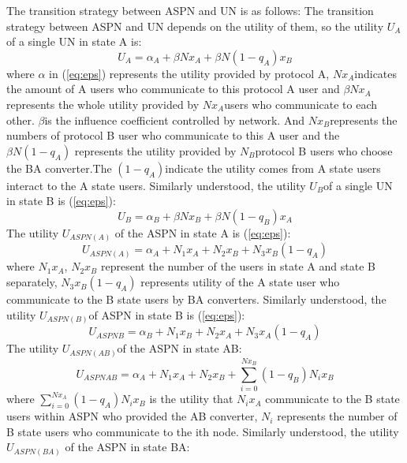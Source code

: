 \documentclass{article}
\begin{document}
The transition strategy between ASPN and UN is as follows:
The transition strategy between ASPN and UN depends on the utility of them, so the utility \(U_{A}\) of a single UN
in state A is:
\begin{displaymath} \label{eq:eps}
U_{A}=\alpha_{A}+\beta Nx_{A}+\beta N(1-q_{A})x_{B}
\end{displaymath}
where \(\alpha\) in (\ref{eq:eps}) represents the utility provided by protocol A, \(Nx_{A}\)indicates the amount of
A users who communicate to this protocol A user and \(\beta Nx_{A}\) represents the whole utility provided
by \(Nx_{A}\)users who communicate to each other. \(\beta\)is the influence coefficient controlled by network.
And \(Nx_{B}\)represents the numbers of protocol B user who communicate to this A user and the \(\beta N(1-q_{A})\)
represents the utility provided by \(N_{B}\)protocol B users who choose the BA converter.The \((1-q_{A})\)indicate the
utility comes from A state users interact to the A state users. Similarly understood, the utility \(U_{B}\)of a single UN in
state B is (\ref{eq:eps}):
\begin{displaymath}\label{eq:eps}
U_{B}=\alpha_{B}+\beta Nx_{B}+\beta N(1-q_{B})x_{A}
\end{displaymath}
The utility \(U_{ASPN(A)}\) of the ASPN in state A is (\ref{eq:eps}):
\begin{displaymath}\label{eq:eps}
U_{ASPN(A)}=\alpha_{A}+N_{1}x_{A}+N_{2}x_{B}+N_{3}x_{B}(1-q_{A})
\end{displaymath}
where \(N_{1}x_{A}\), \(N_{2}x_{B}\) represent the number of the users in state A and state B separately,
\(N_{3}x_{B}(1-q_{A})\) represents utility of the A state user who communicate to the B state users by
BA converters. Similarly understood, the utility \(U_{ASPN(B)}\)of ASPN in state B is (\ref{eq:eps}):
\begin{displaymath} \label{eq:eps}
U_{ASPN{B}}=\alpha_{B}+N_{1}x_{B}+N_{2}x_{A}+N_{3}x_{A}(1-q_{A})
\end{displaymath}
The utility \(U_{ASPN(AB)}\)of the ASPN in state AB:
\begin{displaymath}
U_{ASPN{AB}}=\alpha_{A}+N_{1}x_{A}+N_{2}x_{B}+\sum_{i=0}^{Nx_{B}}(1-q_{B})N_{i}x_{B}
\end{displaymath}
where \(\sum_{i=0}^{Nx_{A}}(1-q_{A})N_{i}x_{B}\) is the utility that \(N_{i}x_{A}\) communicate to the B state users
within ASPN who provided the AB converter, \(N_{i}\) represents the number of B state users who communicate to the ith node.
Similarly understood, the utility \(U_{ASPN(BA)}\) of the ASPN in state BA:
\end{document}
